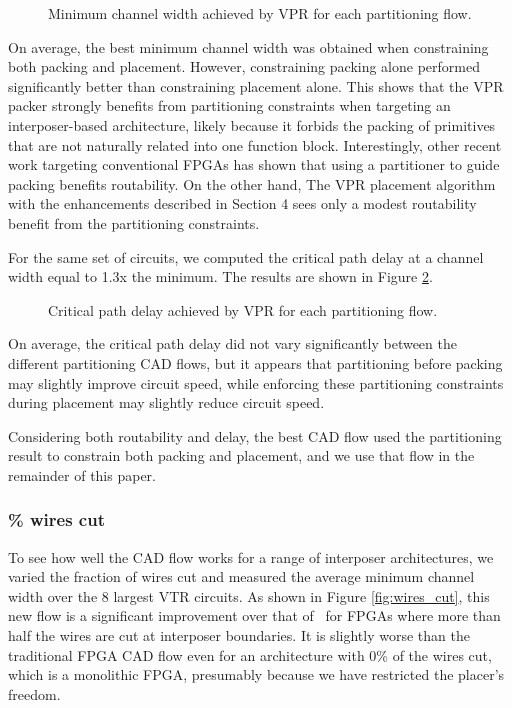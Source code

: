 \begin{figure}[!htbp]
\centering

\caption{Minimum channel width achieved by VPR for each partitioning flow.}
\label{fig:flows_mcw}
\end{figure}

On average, the best minimum channel width was obtained when constraining both packing and placement. However, constraining packing alone performed significantly better than constraining placement alone. This shows that the VPR packer strongly benefits from partitioning constraints when targeting an interposer-based architecture, likely because it forbids the packing of primitives that are not naturally related into one function block. Interestingly, other recent work targeting conventional FPGAs has shown that using a partitioner to guide packing benefits routability\cite{feng2014rent}. On the other hand, The VPR placement algorithm with the enhancements described in Section 4 sees only a modest routability benefit from the partitioning constraints.

For the same set of circuits, we computed the critical path delay at a channel width equal to 1.3x the minimum. The results are shown in Figure \ref{fig:flows_crit_path}.

\begin{figure}[!htbp]
\centering

\caption{Critical path delay achieved by VPR for each partitioning flow.}
\label{fig:flows_crit_path}
\end{figure}

On average, the critical path delay did not vary significantly between the different partitioning CAD flows, but it appears that partitioning before packing may slightly improve circuit speed, while enforcing these partitioning constraints during placement may slightly reduce circuit speed.

Considering both routability and delay, the best CAD flow used the partitioning result to constrain both packing and placement, and we use that flow in the remainder of this paper.

\subsubsection{\% wires cut}
To see how well the CAD flow works for a range of interposer architectures, we varied the fraction of wires cut and measured the average minimum channel width over the 8 largest VTR circuits. As shown in Figure \ref{fig:wires_cut}, this new flow is a significant improvement over that of~\cite{interposer2014} for FPGAs where more than half the wires are cut at interposer boundaries. It is slightly worse than the traditional FPGA CAD flow even for an architecture with 0\% of the wires cut, which is a monolithic FPGA, presumably because we have restricted the placer's freedom.

